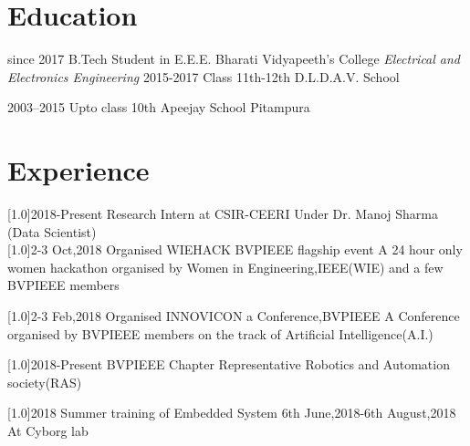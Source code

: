 \documentclass[espanol]{cv-style}     %
\begin{document}
\section{Education}

\begin{entrylist}
  \entry
    {since 2017}
    {B.Tech Student in E.E.E.}
    {Bharati Vidyapeeth's College}
    {\emph{Electrical and Electronics Engineering}}
  \entry
    {2015-2017}
    {Class 11th-12th}
    {D.L.D.A.V. School}
    
  \entry
    {2003–2015}
    {Upto class 10th}
    {Apeejay School Pitampura}
  
\end{entrylist}
\section{Experience}
  \vspace{-0.2cm}
\begin{entrylist}
\entry
{\scalebox{.8}[1.0]{2018-Present}}
{Research Intern at CSIR-CEERI}
{}
{{Under Dr. Manoj Sharma (Data Scientist)}}\\
\entry
{\scalebox{.8}[1.0]{2-3 Oct,2018}}
{Organised WIEHACK BVPIEEE flagship event}
{   }
{A 24 hour only women hackathon organised by Women in Engineering,IEEE(WIE) and a few BVPIEEE members}

\entry
{\scalebox{.8}[1.0]{2-3 Feb,2018}}
{Organised INNOVICON a Conference,BVPIEEE}
{   }
{A Conference organised by BVPIEEE members on the track of Artificial Intelligence(A.I.)}

\entry
{\scalebox{.8}[1.0]{2018-Present}}
{BVPIEEE Chapter Representative}
{   }
{Robotics and Automation society(RAS)}

\entry
{\scalebox{.8}[1.0]{2018}}
{Summer training of Embedded System}
{6th June,2018-6th August,2018}
{At Cyborg lab}
\end{entrylist}
\end{document}
